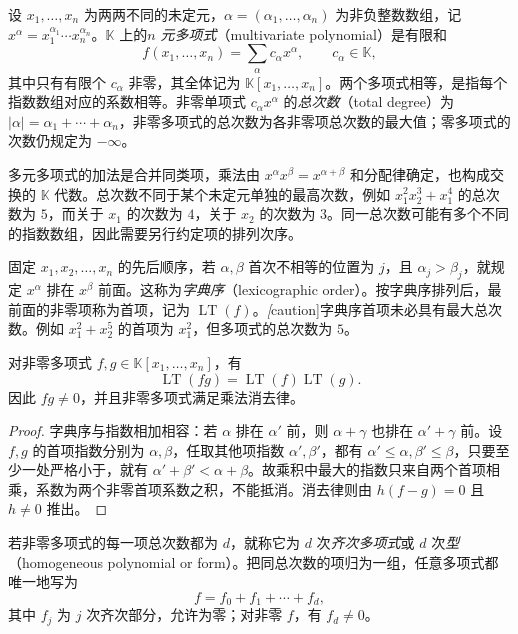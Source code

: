 \begin{definition}
设 $x_1,\ldots,x_n$ 为两两不同的未定元，$\alpha=(\alpha_1,\ldots,\alpha_n)$ 为非负整数数组，记 $x^\alpha=x_1^{\alpha_1}\cdots x_n^{\alpha_n}$。$\mathbb K$ 上的\emph{$n$ 元多项式}（multivariate polynomial）是有限和
\[
    f(x_1,\ldots,x_n)=\sum_\alpha c_\alpha x^\alpha,
    \qquad c_\alpha\in\mathbb K,
\]
其中只有有限个 $c_\alpha$ 非零，其全体记为 $\mathbb K[x_1,\ldots,x_n]$。两个多项式相等，是指每个指数数组对应的系数相等。非零单项式 $c_\alpha x^\alpha$ 的\emph{总次数}（total degree）为 $|\alpha|=\alpha_1+\cdots+\alpha_n$，非零多项式的总次数为各非零项总次数的最大值；零多项式的次数仍规定为 $-\infty$。
\end{definition}

多元多项式的加法是合并同类项，乘法由 $x^\alpha x^\beta=x^{\alpha+\beta}$ 和分配律确定，也构成交换的 $\mathbb K$ 代数。总次数不同于某个未定元单独的最高次数，例如 $x_1^2x_2^3+x_1^4$ 的总次数为 $5$，而关于 $x_1$ 的次数为 $4$，关于 $x_2$ 的次数为 $3$。同一总次数可能有多个不同的指数数组，因此需要另行约定项的排列次序。

固定 $x_1,x_2,\ldots,x_n$ 的先后顺序，若 $\alpha,\beta$ 首次不相等的位置为 $j$，且 $\alpha_j>\beta_j$，就规定 $x^\alpha$ 排在 $x^\beta$ 前面。这称为\emph{字典序}（lexicographic order）。按字典序排列后，最前面的非零项称为首项，记为 $\operatorname{LT}(f)$。\emph[caution]{字典序首项未必具有最大总次数。}例如 $x_1^2+x_2^5$ 的首项为 $x_1^2$，但多项式的总次数为 $5$。

\begin{lemma}
\label{lem:multivariate-leading-term}
对非零多项式 $f,g\in\mathbb K[x_1,\ldots,x_n]$，有
\[
    \operatorname{LT}(fg)=\operatorname{LT}(f)\operatorname{LT}(g).
\]
因此 $fg\ne0$，并且非零多项式满足乘法消去律。
\end{lemma}
\begin{proof}
字典序与指数相加相容：若 $\alpha$ 排在 $\alpha'$ 前，则 $\alpha+\gamma$ 也排在 $\alpha'+\gamma$ 前。设 $f,g$ 的首项指数分别为 $\alpha,\beta$，任取其他项指数 $\alpha',\beta'$，都有 $\alpha'\leq\alpha,\beta'\leq\beta$，只要至少一处严格小于，就有 $\alpha'+\beta'<\alpha+\beta$。故乘积中最大的指数只来自两个首项相乘，系数为两个非零首项系数之积，不能抵消。消去律则由 $h(f-g)=0$ 且 $h\ne0$ 推出。
\end{proof}

\begin{definition}
若非零多项式的每一项总次数都为 $d$，就称它为 $d$ 次\emph{齐次多项式}或 $d$ 次\emph{型}（homogeneous polynomial or form）。把同总次数的项归为一组，任意多项式都唯一地写为
\[
    f=f_0+f_1+\cdots+f_d,
\]
其中 $f_j$ 为 $j$ 次齐次部分，允许为零；对非零 $f$，有 $f_d\ne0$。
\end{definition}

